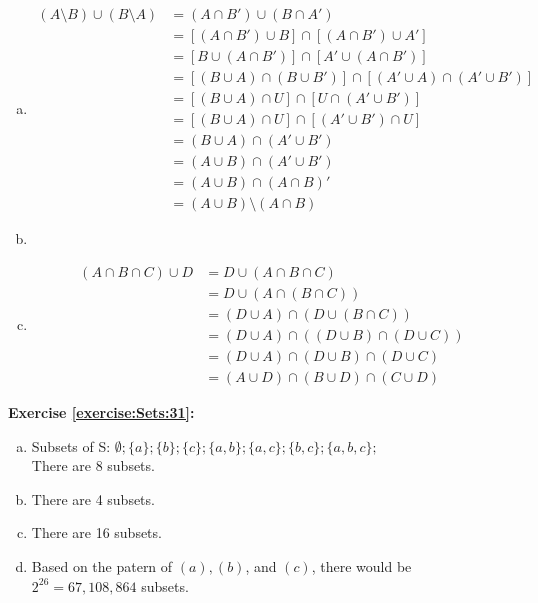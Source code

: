 \begin{enumerate}[(a)]
\item
\begin{align*}
(A \setminus B) \cup (B \setminus A) &= (A\cap B') \cup (B \cap A')\\
&= [(A\cap B') \cup B] \cap [(A \cap B') \cup A']\\
&= [B \cup (A\cap B')] \cap [A' \cup (A \cap B')]\\
&= [(B \cup A) \cap (B \cup B')] \cap [(A' \cup A) \cap (A' \cup B')]\\
&= [(B \cup A) \cap U] \cap [U \cap (A' \cup B')]\\
&= [(B \cup A) \cap U] \cap [(A' \cup B') \cap U]\\
&= (B \cup A) \cap (A' \cup B') \\
&= (A \cup B) \cap (A' \cup B') \\
&= (A \cup B) \cap (A \cap B)' \\
&= (A \cup B) \setminus (A \cap B)
\end{align*}

\item

\item
\begin{align*}
(A \cap B \cap C) \cup D &= D \cup (A \cap B \cap C) \\
&= D \cup (A \cap (B \cap C)) \\
&= (D \cup A) \cap (D \cup (B \cap C)) \\
&= (D \cup A) \cap ((D \cup B) \cap (D \cup C)) \\
&= (D \cup A) \cap (D \cup B) \cap (D \cup C) \\\
&= (A \cup D) \cap (B \cup D) \cap (C \cup D)
\end{align*}
\end{enumerate}

\noindent\textbf{Exercise \ref{exercise:Sets:31}:} %
\begin{enumerate}[(a)]
\item
Subsets of S: $\emptyset; \{a\};\{b\};\{c\};\{a,b\};\{a,c\};\{b,c\};\{a,b,c\};$\\
There are 8 subsets.

\item
There are 4 subsets.

\item
There are 16 subsets.

\item
Based on the patern of $(a), (b)$, and $(c)$, there would be $2^{26}=67,108,864$ subsets.
\end{enumerate}

